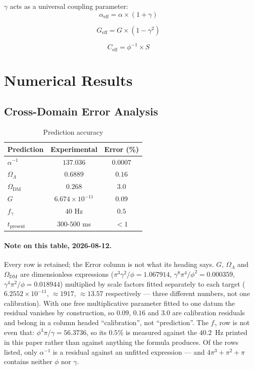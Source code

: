 \documentclass[12pt,a4paper]{article}
\begin{document}
$\gamma$ acts as a universal coupling parameter:
\begin{equation}
\alpha_{\text{eff}} = \alpha \times (1 + \gamma)
\end{equation}

\begin{equation}
G_{\text{eff}} = G \times (1 - \gamma^2)
\end{equation}

\begin{equation}
C_{\text{eff}} = \phi^{-1} \times S
\end{equation}

\section{Numerical Results}

\subsection{Cross-Domain Error Analysis}

\begin{table}[h]
\centering
\begin{tabular}{lcc}
\toprule
Prediction & Experimental & Error (\%) \\
\midrule
$\alpha^{-1}$ & $137.036$ & $0.0007$ \\
$\Omega_\Lambda$ & $0.6889$ & $0.16$ \\
$\Omega_{\text{DM}}$ & $0.268$ & $3.0$ \\
$G$ & $6.674 \times 10^{-11}$ & $0.09$ \\
$f_\gamma$ & $40$ Hz & $0.5$ \\
$t_{\text{present}}$ & $300\text{-}500$ ms & $< 1$ \\
\bottomrule
\end{tabular}
\caption{Prediction accuracy}
\end{table}

\paragraph{Note on this table, 2026-08-12.} Every row is retained; the Error column is not what its heading says. $G$, $\Omega_\Lambda$ and $\Omega_{\mathrm{DM}}$ are dimensionless expressions ($\pi^3\gamma^2/\phi = 1.067914$, $\gamma^8\pi^4/\phi^2 = 0.000359$, $\gamma^4\pi^2/\phi = 0.018944$) multiplied by scale factors fitted separately to each target ($6.2552\times10^{-11}$, $\approx 1917$, $\approx 13.57$ respectively --- three different numbers, not one calibration). With one free multiplicative parameter fitted to one datum the residual vanishes by construction, so $0.09$, $0.16$ and $3.0$ are calibration residuals and belong in a column headed ``calibration'', not ``prediction''. The $f_\gamma$ row is not even that: $\phi^3\pi/\gamma = 56.3736$, so its $0.5\%$ is measured against the $40.2$~Hz printed in this paper rather than against anything the formula produces. Of the rows listed, only $\alpha^{-1}$ is a residual against an unfitted expression --- and $4\pi^3 + \pi^2 + \pi$ contains neither $\phi$ nor $\gamma$.
\end{document}
